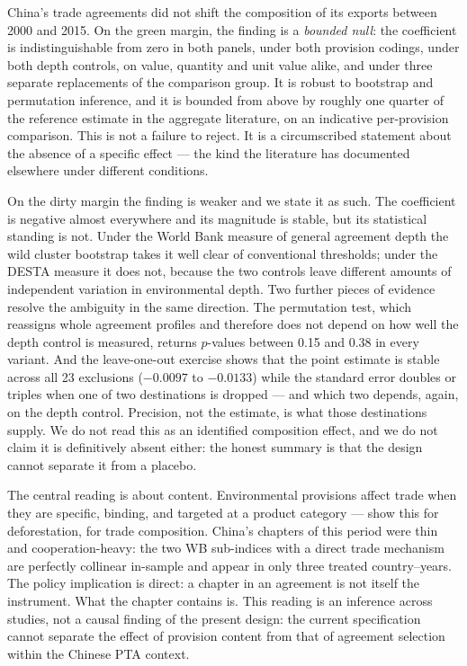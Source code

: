 \documentclass[12pt]{article}
\begin{document}
China's trade agreements did not shift the composition of its exports between 2000 and 2015.
On the green margin, the finding is a \emph{bounded null}: the coefficient is indistinguishable
from zero in both panels, under both provision codings, under both depth controls, on value,
quantity and unit value alike, and under three separate replacements of the comparison group.
It is robust to bootstrap and permutation inference, and it is bounded from above by roughly one
quarter of the reference estimate in the aggregate literature, on an indicative per-provision comparison. This is not a failure to reject.
It is a circumscribed statement about the absence of a specific effect --- the kind the
literature has documented elsewhere under different conditions.

On the dirty margin the finding is weaker and we state it as such. The coefficient is negative
almost everywhere and its magnitude is stable, but its statistical standing is not. Under the
World Bank measure of general agreement depth the wild cluster bootstrap takes it well clear of
conventional thresholds; under the DESTA measure it does not, because the two controls leave
different amounts of independent variation in environmental depth. Two further pieces of
evidence resolve the ambiguity in the same direction. The permutation test, which reassigns
whole agreement profiles and therefore does not depend on how well the depth control is
measured, returns $p$-values
between 0.15 and 0.38 in every variant. And the leave-one-out exercise shows that the point
estimate is stable across all 23 exclusions ($-0.0097$ to $-0.0133$) while the standard error
doubles or triples when one of two destinations is dropped --- and which two depends, again, on
the depth control. Precision, not the estimate, is what those destinations supply. We do not
read this as an identified composition effect, and we do not claim it is definitively absent
either: the honest summary is that the design cannot separate it from a placebo.

The central reading is about content. Environmental provisions affect trade when they are
specific, binding, and targeted at a product category --- \citet{abman2024} show this for
deforestation, \citet{brandi2020} for trade composition. China's chapters of this period
were thin and cooperation-heavy: the two WB sub-indices with a direct trade mechanism are
perfectly collinear in-sample and appear in only three treated country--years. The policy
implication is direct: a chapter in an agreement is not itself the instrument. What the
chapter contains is. This reading is an inference across studies, not a causal finding of
the present design: the current specification cannot separate the effect of provision
content from that of agreement selection within the Chinese PTA context.
\end{document}
